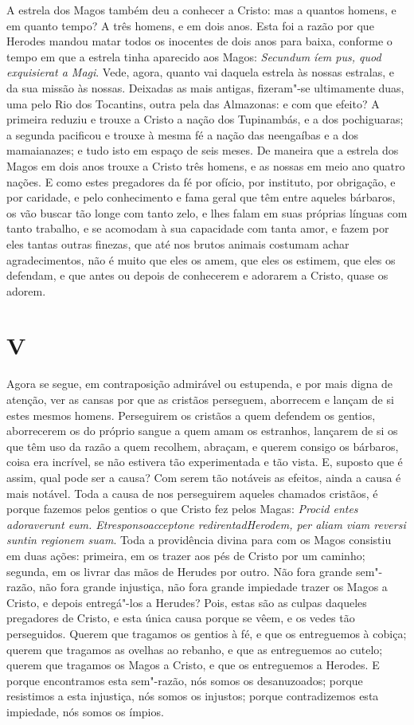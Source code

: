 A estrela dos Magos também deu a conhecer a Cristo: mas a quantos
homens, e em quanto tempo? A três homens, e em dois anos. Esta foi a
razão por que Herodes mandou matar todos os inocentes de dois anos para
baixa, conforme o tempo em que a estrela tinha aparecido aos Magos:
\emph{Secundum íem pus, quod exquisierat a Magi}.
Vede, agora, quanto vai daquela estrela às nossas estralas, e da sua
missão às nossas. Deixadas as mais antigas, fizeram"-se ultimamente duas,
uma pelo Rio dos Tocantins, outra pela das Almazonas: e com que efeito?
A primeira reduziu e trouxe a Cristo a nação dos Tupinambás, e a dos
pochiguaras; a segunda pacificou e trouxe à mesma fé a nação das
neengaíbas e a dos mamaianazes; e tudo isto em espaço de seis meses. De
maneira que a estrela dos Magos em dois anos trouxe a Cristo três
homens, e as nossas em meio ano quatro nações. E como estes pregadores
da fé por ofício, por instituto, por obrigação, e por caridade, e pelo
conhecimento e fama geral que têm entre aqueles bárbaros, os vão buscar
tão longe com tanto zelo, e lhes falam em suas próprias línguas com
tanto trabalho, e se acomodam à sua capacidade com tanta amor, e fazem
por eles tantas outras finezas, que até nos brutos animais costumam
achar agradecimentos, não é muito que eles os amem, que eles os estimem,
que eles os defendam, e que antes ou depois de conhecerem e adorarem a
Cristo, quase os adorem.

\section*{V}

Agora se segue, em contraposição admirável ou estupenda, e por mais
digna de atenção, ver as cansas por que as cristãos perseguem,
aborrecem e lançam de si estes mesmos homens. Perseguirem os cristãos a
quem defendem os gentios, aborrecerem os do próprio sangue a quem amam
os estranhos, lançarem de si os que têm uso da razão a quem recolhem,
abraçam, e querem consigo os bárbaros, coisa era incrível, se não
estivera tão experimentada e tão vista. E, suposto que é assim, qual
pode ser a causa? Com serem tão notáveis as efeitos, ainda a causa é
mais notável. Toda a causa de nos perseguirem aqueles chamados cristãos,
é porque fazemos pelos gentios o que Cristo fez pelos Magas:
\emph{Procid entes adoraverunt eum. Etresponsoacceptone
redirentadHerodem, per aliam viam reversi suntin regionem suam}.
 Toda a providência divina para com os Magos consistiu em
duas ações: primeira, em os trazer aos pés de Cristo por um caminho;
segunda, em os livrar das mãos de Herudes por outro. Não fora grande
sem"-razão, não fora grande injustiça, não fora grande impiedade trazer
os Magos a Cristo, e depois entregá"-los a Herudes? Pois, estas são as
culpas daqueles pregadores de Cristo, e esta única causa porque se vêem,
e os vedes tão perseguidos. Querem que tragamos os gentios à fé, e que
os entreguemos à cobiça; querem que tragamos as ovelhas ao rebanho, e
que as entreguemos ao cutelo; querem que tragamos os Magos a Cristo, e
que os entreguemos a Herodes. E porque encontramos esta sem"-razão, nós
somos os desanuzoados; porque resistimos a esta injustiça, nós somos os
injustos; porque contradizemos esta impiedade, nós somos os ímpios.

